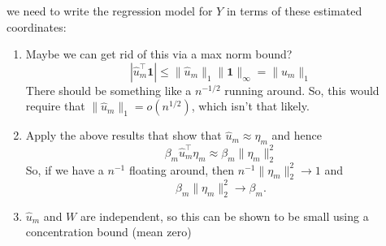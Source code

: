 \documentclass[11pt]{article}
\newcommand{\norm}[1]{\lVert #1 \rVert}
\begin{document}
\begin{enumerate}
we need to write the regression model for $Y$ in terms of these estimated coordinates:
\begin{enumerate}
\item Maybe we can get rid of this via a max norm bound?
\begin{equation}
| \hat{u}_m^{\top}\mathbf{1}| \leq  \norm{\hat{u}_m}_1\norm{\mathbf{1}}_{\infty} =  \norm{\hat{u}_m}_1
\end{equation}
There should be something like a $n^{-1/2}$ running around.  So, this would require that $\norm{\hat{u}_m}_1 = o(n^{1/2})$, which isn't that likely.
\item Apply the above results that show that $\hat{u}_m \approx \eta_m$ and hence 
\begin{equation}
 \beta_m  \hat{u}_m^{\top}\eta_m 
 \approx  \beta_m \norm{\eta_m}_2^2 
\end{equation}
So, if we have a $n^{-1}$ floating around, then $n^{-1}\norm{\eta_m}_2^2 \rightarrow 1$ and
\begin{equation}
 \beta_m \norm{\eta_m}_2^2  \rightarrow \beta_m.
\end{equation}
\item $\hat{u}_m$ and $W$ are independent, so this can be shown to be small using a concentration bound (mean zero)
\end{enumerate}
\end{enumerate}

\end{document}
